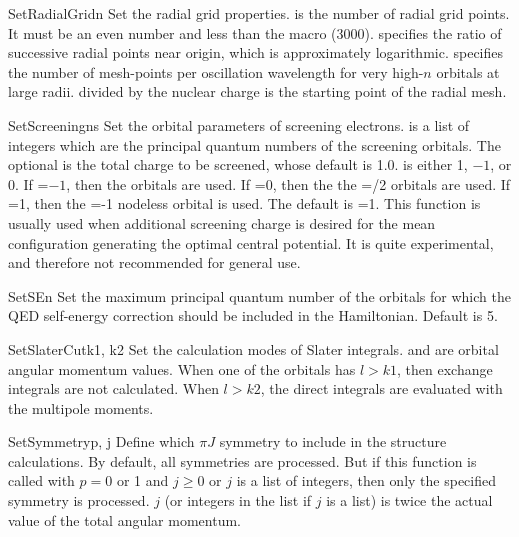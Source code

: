 \begin{fundesc}{SetRadialGrid}{n}
Set the radial grid properties.  is the number of radial grid points. It
must be an even number and less than the macro  (3000). 
specifies the ratio of successive radial points near  origin, which is
approximately logarithmic.  specifies the number of mesh-points per
oscillation wavelength for very high-$n$ orbitals at large  radii. 
divided by the nuclear charge is the starting point of the radial mesh.
\end{fundesc}

\begin{fundesc}{SetScreening}{ns}
Set the orbital parameters of screening electrons.  is a list of
integers which are the principal quantum numbers of the screening
orbitals. The optional  is the total charge to be screened, whose
default is 1.0.  is either 1, $-1$, or 0. If =$-1$, then
the  orbitals are used. If =0, then the the =/2
orbitals are used. If =1, then the =-1 nodeless orbital
is used. The default is =1. This function is usually used when
additional screening charge is desired for the mean configuration generating
the optimal central potential. It is quite experimental, and therefore not
recommended for general use.
\end{fundesc}

\begin{fundesc}{SetSE}{n}
Set the maximum principal quantum number of the orbitals for which the QED
self-energy correction should be included in the Hamiltonian. Default is 5.
\end{fundesc}

\begin{fundesc}{SetSlaterCut}{k1, k2}
Set the calculation modes of Slater integrals.  and  are orbital
angular momentum values. When one of the orbitals has $l > k1$, then exchange
integrals are not calculated. When $l > k2$, the direct integrals are evaluated
with the multipole moments.
\end{fundesc}

\begin{fundesc}{SetSymmetry}{p, j}
Define which $\pi J$ symmetry to include in the structure calculations. By
default, all symmetries are processed. But if this function is called with $p=0$
or 1 and $j \ge 0$ or $j$ is a list of integers, then only the specified
symmetry is processed. $j$ (or integers in the list if $j$ is a list) is twice
the actual value of the total angular momentum.
\end{fundesc}

